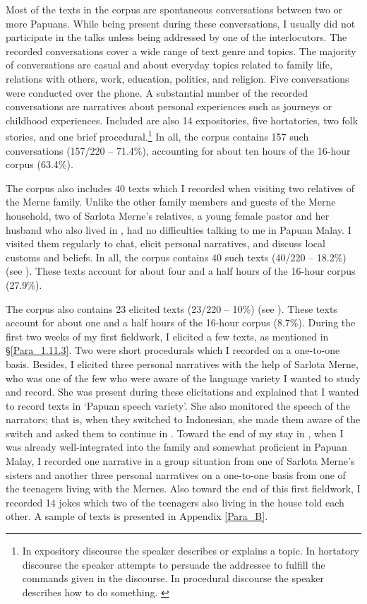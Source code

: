 {Most of the texts in the corpus are spontaneous conversations between two or more Papuans. While being present during these conversations, I usually did not participate in the talks unless being addressed by one of the interlocutors. The recorded conversations cover a wide range of text genre and topics. The majority of conversations are casual and about everyday topics related to family life, relations with others, work, education, politics, and religion. Five conversations were conducted over the phone. A substantial number of the recorded conversations are narratives about personal experiences such as journeys or childhood experiences. Included are also 14 expositories, five hortatories, two folk stories, and one brief procedural.\footnote{In expository discourse the speaker describes or explains a topic. In hortatory discourse the speaker attempts to persuade the addressee to fulfill the commands given in the discourse. In procedural discourse the speaker describes how to do something. \citep{Loos.2003}} In all, the corpus contains 157 such conversations (157/220 – 71.4\%), accounting for about ten hours of the 16-hour corpus (63.4\%).



The corpus also includes 40 texts which I recorded when visiting two relatives of the Merne family. Unlike the other family members and guests of the Merne household, two of Sarlota Merne’s relatives, a young female pastor and her husband who also lived in , had no difficulties talking to me in Papuan Malay. I visited them regularly to chat, elicit personal narratives, and discuss local customs and beliefs. In all, the corpus contains 40 such texts (40/220 – 18.2\%) (see ). These texts account for about four and a half hours of the 16-hour corpus (27.9\%).


The corpus also contains 23 elicited texts (23/220 – 10\%) (see ). These texts account for about one and a half hours of the 16-hour corpus (8.7\%). During the first two weeks of my first fieldwork, I elicited a few texts, as mentioned in §\ref{Para_1.11.3}. Two were short procedurals which I recorded on a one-to-one basis. Besides, I elicited three personal narratives with the help of Sarlota Merne, who was one of the few who were aware of the language variety I wanted to study and record. She was present during these elicitations and explained that I wanted to record texts in  ‘Papuan speech variety’. She also monitored the speech of the narrators; that is, when they switched to Indonesian, she made them aware of the switch and asked them to continue in . Toward the end of my stay in , when I was already well-integrated into the family and somewhat proficient in Papuan Malay, I recorded one narrative in a group situation from one of Sarlota Merne’s sisters and another three personal narratives on a one-to-one basis from one of the teenagers living with the Mernes. Also toward the end of this first fieldwork, I recorded 14 jokes which two of the teenagers also living in the house told each other. A sample of texts is presented in Appendix \ref{Para_B}.


}
